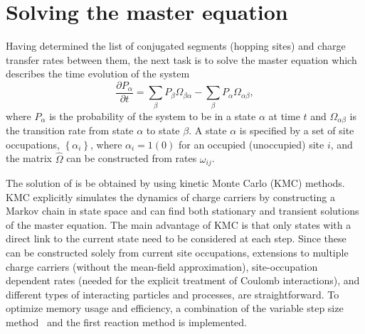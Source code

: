 \chapter{Solving the master equation}
\label{sec:kmc}

Having determined the list of conjugated segments (hopping sites) and charge transfer rates between them, the next task is to solve the master equation which describes the time evolution of the system
%
\begin{equation}
\label{equ:master}
\frac{\partial P_\alpha}{\partial t} = \sum_{\beta} P_\beta \Omega_{\beta \alpha} - 
\sum_{\beta} P_\alpha \Omega_{\alpha \beta},
\end{equation}
%
where $P_\alpha$ is the probability of the system to be in a state $\alpha$ at time $t$ and $\Omega_{\alpha \beta}$ is the transition rate from state $\alpha$ to state $\beta$. A state $\alpha$ is specified by a set of site occupations, $\left\{ \alpha_i \right\}$, where $\alpha_i = 1 (0)$ for an occupied (unoccupied) site $i$, and the matrix $\hat{\Omega}$ can be constructed from rates $\omega_{ij}$.

The solution of  is be obtained by using kinetic Monte Carlo (KMC) methods. KMC explicitly simulates the dynamics of charge carriers by constructing a Markov chain in state space and can find both stationary and transient solutions of the master equation. The main advantage of KMC is that only states with a direct link to the current state need to be considered at each step. Since these can be constructed solely from current site occupations, extensions to multiple charge carriers (without the mean-field approximation), site-occupation dependent rates (needed for the explicit treatment of Coulomb interactions), and different types of interacting particles and processes, are straightforward. To optimize memory usage and efficiency, a combination of the variable step size method~\cite{bortz_new_1975} and the first reaction method is implemented.
